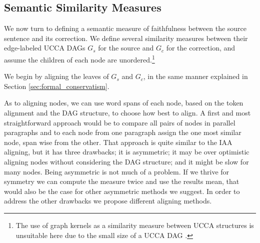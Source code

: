 \documentclass[letter,11pt]{article}
\begin{document}
{\subsection{Semantic Similarity Measures}

We now turn to defining a semantic measure of faithfulness between the source
sentence and its correction. We define several similarity measures between
their edge-labeled UCCA DAGs $G_s$ for the source and $G_c$ for the correction,
and assume the children of each node are unordered.\footnote{The use of graph kernels
  as a similarity measure between UCCA 
  structures is unsuitable here due to the small size of a UCCA DAG \cite{kashima2003marginalized}.} 



We begin by aligning the leaves of $G_s$ and $G_c$, in the same manner explained
in Section \ref{sec:formal_conservatism}.

As to aligning nodes, we can use word spans of each node, based on
the token alignment and the DAG structure, to choose how best to align.
A first and most straightforward approach would be to compare all
pairs of nodes in parallel paragraphs and to each node from one paragraph
assign the one most similar node, span wise from the other. That approach
is quite similar to the IAA aligning, but it
has three drawbacks; it is asymmetric; it may be over optimistic aligning
nodes without considering the DAG structure; and it might be
slow for many nodes. Being asymmetric is not much of a problem. If we thrive for symmetry
we can compute the measure twice and use the results mean,
that would also be the case for other asymmetric methods we suggest.
In order to address the other drawbacks we propose different aligning methods.

}
\end{document}
